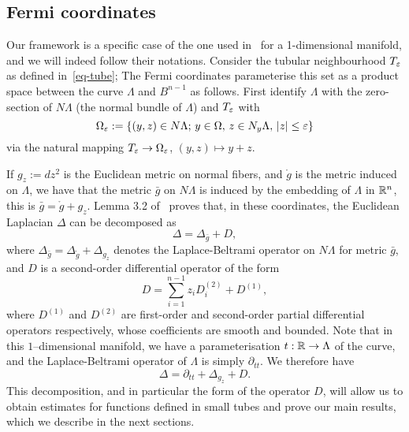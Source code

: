 
\subsection{Fermi coordinates}\label{sec:fermi}

Our framework is a specific case of the one used in~\cite{Pacard2014} for a
1-dimensional manifold, and we will indeed follow their notations. Consider the
tubular neighbourhood $T_\varepsilon$ as defined in~\ref{eq-tube}; The Fermi coordinates
parameterise this set as a product space between the curve $\Lambda$ and
$B^{n-1}$ as follows. First identify $\Lambda$ with the zero-section of
$N\Lambda$ (the normal bundle of $\Lambda$) and $T_\varepsilon$ with
\[
\Omega_\varepsilon:=\{(y,z)\in N\Lambda;\, y\in\Omega,\, z\in N_y\Lambda,\, |z|\leq\varepsilon\}
\]
via the natural mapping $T_\varepsilon\to\Omega_\varepsilon$, $(y,z)\mapsto y+z$.

If $g_z:=dz^2$ is the Euclidean metric on normal fibers, and $\mathring{g}$ is
the metric induced on $\Lambda$, we have that the metric $\bar g$ on $N\Lambda$
is induced by the embedding of $\Lambda$ in $\mathbb{R}^n$, this is $\bar g=\mathring
g+g_z$. Lemma 3.2 of~\cite{Pacard2014} proves that, in these coordinates, the
Euclidean Laplacian $\Delta$ can be decomposed as
\begin{equation}
\Delta = \Delta_{\bar g} + D,
\end{equation}
where $\Delta_{\bar g}=\Delta_{\mathring g}+\Delta_{g_z}$ denotes the
Laplace-Beltrami operator on $N\Lambda$ for metric $\bar g$, and $D$ is a
second-order differential operator of the form
\begin{equation}
    D = \sum_{i=1}^{n-1} z_{i}D_i^{(2)}+D^{(1)},
\end{equation}
where $D^{(1)}$ and $D^{(2)}$ are first-order and second-order partial
differential operators respectively, whose
coefficients are smooth and bounded.
Note that in this $1$--dimensional manifold, we have a parameterisation
$t:\mathbb{R}\to\Lambda$ of the curve, and the Laplace-Beltrami operator of $\Lambda$
is simply $\partial_{tt}$. We therefore have
\begin{equation}
    \Delta = \partial_{tt}+\Delta_{g_z}+D.
\end{equation}
This decomposition, and in particular the form of the operator $D$, will allow
us to obtain estimates for functions defined in small tubes and prove our main
results, which we describe in the next sections.
